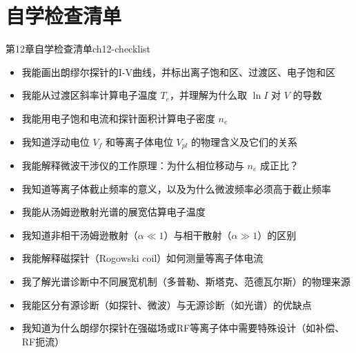 
\section{自学检查清单}

\begin{checklistbox}{第12章自学检查清单}{ch12-checklist}
\begin{itemize}[leftmargin=*,label=$\square$]
\item[$\square$] 我能画出朗缪尔探针的I-V曲线，并标出离子饱和区、过渡区、电子饱和区
\item[$\square$] 我能从过渡区斜率计算电子温度 $T_e$，并理解为什么取 $\ln I$ 对 $V$ 的导数
\item[$\square$] 我能用电子饱和电流和探针面积计算电子密度 $n_e$
\item[$\square$] 我知道浮动电位 $V_f$ 和等离子体电位 $V_{pl}$ 的物理含义及它们的关系
\item[$\square$] 我能解释微波干涉仪的工作原理：为什么相位移动与 $n_e$ 成正比？
\item[$\square$] 我知道等离子体截止频率的意义，以及为什么微波频率必须高于截止频率
\item[$\square$] 我能从汤姆逊散射光谱的展宽估算电子温度
\item[$\square$] 我知道非相干汤姆逊散射（$\alpha \ll 1$）与相干散射（$\alpha \gg 1$）的区别
\item[$\square$] 我能解释磁探针（Rogowski coil）如何测量等离子体电流
\item[$\square$] 我了解光谱诊断中不同展宽机制（多普勒、斯塔克、范德瓦尔斯）的物理来源
\item[$\square$] 我能区分有源诊断（如探针、微波）与无源诊断（如光谱）的优缺点
\item[$\square$] 我知道为什么朗缪尔探针在强磁场或RF等离子体中需要特殊设计（如补偿、RF扼流）
\end{itemize}
\end{checklistbox}

\endinput
